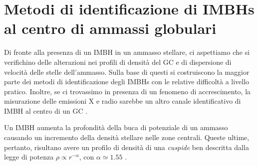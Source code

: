 \section{Metodi di identificazione di IMBHs al centro di ammassi globulari}
\label{sec:identificazione}

Di fronte alla presenza di un IMBH in un ammasso stellare, ci aspettiamo che si verifichino delle alterazioni nei profili di densità del GC e di dispersione di velocità delle stelle dell'ammasso. Sulla base di questi si costruiscono la maggior parte dei metodi di identificazione degli IMBHs con le relative difficoltà a livello pratico. Inoltre, se ci trovassimo in presenza di un fenomeno di accrescimento, la misurazione delle emissioni X e radio sarebbe un altro canale identificativo di IMBH al centro di un GC \cite{strader:paper}.

Un IMBH aumenta la profondità della buca di potenziale di un ammasso causando un incremento della densità stellare nelle zone centrali. Queste ultime, pertanto, risultano avere un profilo di densità di una \textit{cuspide} ben descritta dalla legge di potenza $\rho \propto r^{-\alpha}$, con $\alpha \simeq 1.55$ \cite{baum:paper}.  

